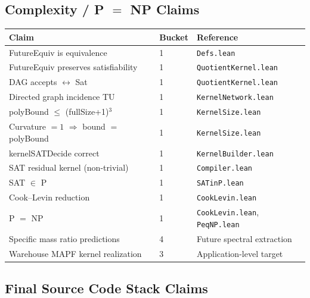 \subsection*{Complexity / P $=$ NP Claims}

\begin{center}
\small
\begin{tabular}{@{}lll@{}}
\hline
\textbf{Claim} & \textbf{Bucket} & \textbf{Reference} \\
\hline
FutureEquiv is equivalence & 1 & \texttt{Defs.lean} \\
FutureEquiv preserves satisfiability & 1 & \texttt{QuotientKernel.lean} \\
DAG accepts $\leftrightarrow$ Sat & 1 & \texttt{QuotientKernel.lean} \\
Directed graph incidence TU & 1 & \texttt{KernelNetwork.lean} \\
polyBound $\leq$ (fullSize+1)$^3$ & 1 & \texttt{KernelSize.lean} \\
Curvature $= 1$ $\Rightarrow$ bound $=$ polyBound & 1 & \texttt{KernelSize.lean} \\
kernelSATDecide correct & 1 & \texttt{KernelBuilder.lean} \\
SAT residual kernel (non-trivial) & 1 & \texttt{Compiler.lean} \\
SAT $\in$ P & 1 & \texttt{SATinP.lean} \\
Cook--Levin reduction & 1 & \texttt{CookLevin.lean} \\
P $=$ NP & 1 & \texttt{CookLevin.lean}, \texttt{PeqNP.lean} \\
\hline
Specific mass ratio predictions & 4 & Future spectral extraction \\
Warehouse MAPF kernel realization & 3 & Application-level target \\
\hline
\end{tabular}
\end{center}

\subsection*{Final Source Code Stack Claims}

